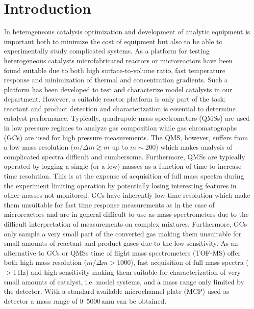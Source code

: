 \documentclass[aip,rsi]{revtex4-1}
\begin{document}
\pacs{}%

\maketitle %

\section{Introduction}
In heterogeneous catalysis optimization and development of analytic equipment is important both to minimize the cost of equipment but also to be able to experimentally study complicated systems. As a platform for testing heterogeneous catalysts microfabricated reactors or microreactors have been found suitable due to both high surface-to-volume ratio, fast temperature response and minimization of thermal and concentration gradients\cite{Jensen2001,Jaehnisch2004}. Such a platform has been developed to test and characterize model catalysts in our department\cite{Henriksen2009}. However, a suitable reactor platform is only part of the task; reactant and product detection and characterization is essential to determine catalyst performance. Typically, quadrupole mass spectrometers (QMSs) are used in low pressure regimes to analyze gas composition while gas chromatographs (GCs) are used for high pressure measurements. The QMS, however, suffers from a low mass resolution ($m/\Delta m\gtrsim m$ up to $m\sim200$) which makes analysis of complicated spectra difficult and cumbersome. Furthermore, QMSs are typically operated by logging a single (or a few) masses as a function of time to increase time resolution. This is at the expense of acquisition of full mass spectra during the experiment limiting operation by potentially losing interesting features in other masses not monitored. GCs have inherently low time resolution which make them unsuitable for fast time response measurements as in the case of microreactors and are in general difficult to use as mass spectrometers due to the difficult interpretation of measurements on complex mixtures. Furthermore, GCs only sample a very small part of the converted gas making them unsuitable for small amounts of reactant and product gases due to the low sensitivity. As an alternative to GCs or QMSs time of flight mass spectrometers (TOF-MS) offer both high mass resolution ($m/\Delta m>1000$), fast acquisition of full mass spectra ($>$1\,Hz) and high sensitivity making them suitable for characterization of very small amounts of catalyst, i.e. model systems, and a mass range only limited by the detector. With a standard available microchannel plate (MCP) used as detector a mass range of \mbox{0--5000}\,amu can be obtained. 
\end{document}
